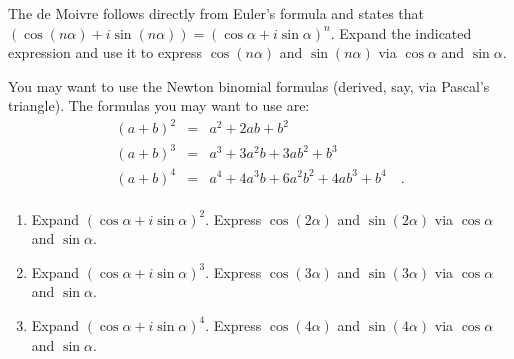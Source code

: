 The de Moivre follows directly from Euler's formula and states that $(\cos (n\alpha) +i\sin (n\alpha) )= (\cos \alpha +i\sin\alpha)^n$. Expand the indicated expression and use it to express $\cos (n\alpha)$ and $\sin (n\alpha)$ via $\cos \alpha$ and $\sin \alpha$.

You may want to use the Newton binomial formulas (derived, say, via Pascal's triangle). The formulas you may want to use are:
\[
\begin{array}{rcl}
(a+b)^2&=&a^2+2ab+b^2\\
(a+b)^3&=&a^3+3a^2b+3ab^2+b^3\\
(a+b)^4&=&a^4+4a^3b+6a^2b^2+4ab^3+b^4\quad .\\
\end{array}
\]

\begin{enumerate}
\item Expand $(\cos \alpha +i\sin \alpha)^2$. Express $\cos (2\alpha)$ and $\sin(2\alpha) $ via $\cos \alpha$ and $\sin \alpha$.

\item Expand $(\cos \alpha +i\sin \alpha)^3$. Express $\cos (3\alpha)$ and  $\sin(3\alpha) $ via $\cos \alpha$ and $\sin \alpha$.

\item Expand $(\cos \alpha +i\sin \alpha)^4$. Express $\cos (4\alpha)$ and  $\sin(4\alpha) $ via $\cos \alpha$ and $\sin \alpha$.


\end{enumerate}